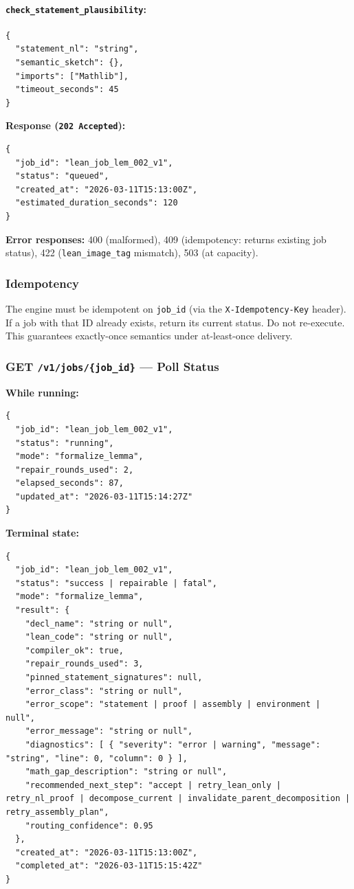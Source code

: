 \documentclass[11pt,a4paper]{article}
\begin{document}
\paragraph{\texttt{check\_statement\_plausibility}:}
\begin{lstlisting}
{
  "statement_nl": "string",
  "semantic_sketch": {},
  "imports": ["Mathlib"],
  "timeout_seconds": 45
}
\end{lstlisting}

\textbf{Response (\texttt{202 Accepted}):}
\begin{lstlisting}
{
  "job_id": "lean_job_lem_002_v1",
  "status": "queued",
  "created_at": "2026-03-11T15:13:00Z",
  "estimated_duration_seconds": 120
}
\end{lstlisting}

\textbf{Error responses:} 400 (malformed), 409 (idempotency: returns existing job status), 422 (\texttt{lean\_image\_tag} mismatch), 503 (at capacity).

\subsubsection{Idempotency}

The engine must be idempotent on \texttt{job\_id} (via the \texttt{X-Idempotency-Key} header). If a job with that ID already exists, return its current status. Do not re-execute. This guarantees exactly-once semantics under at-least-once delivery.

\subsubsection{GET \texttt{/v1/jobs/\{job\_id\}} --- Poll Status}

\textbf{While running:}
\begin{lstlisting}
{
  "job_id": "lean_job_lem_002_v1",
  "status": "running",
  "mode": "formalize_lemma",
  "repair_rounds_used": 2,
  "elapsed_seconds": 87,
  "updated_at": "2026-03-11T15:14:27Z"
}
\end{lstlisting}

\textbf{Terminal state:}
\begin{lstlisting}
{
  "job_id": "lean_job_lem_002_v1",
  "status": "success | repairable | fatal",
  "mode": "formalize_lemma",
  "result": {
    "decl_name": "string or null",
    "lean_code": "string or null",
    "compiler_ok": true,
    "repair_rounds_used": 3,
    "pinned_statement_signatures": null,
    "error_class": "string or null",
    "error_scope": "statement | proof | assembly | environment | null",
    "error_message": "string or null",
    "diagnostics": [ { "severity": "error | warning", "message": "string", "line": 0, "column": 0 } ],
    "math_gap_description": "string or null",
    "recommended_next_step": "accept | retry_lean_only | retry_nl_proof | decompose_current | invalidate_parent_decomposition | retry_assembly_plan",
    "routing_confidence": 0.95
  },
  "created_at": "2026-03-11T15:13:00Z",
  "completed_at": "2026-03-11T15:15:42Z"
}
\end{lstlisting}
\end{document}

